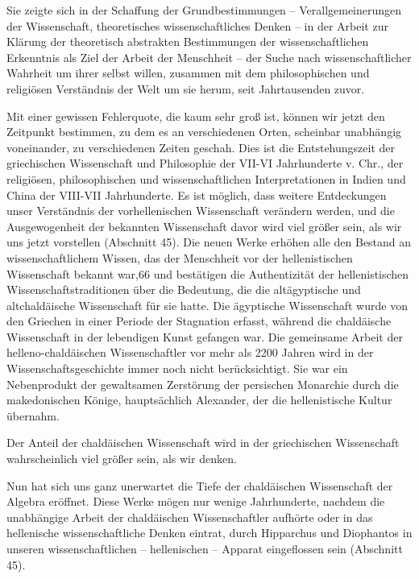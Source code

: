 \documentclass[11pt,a4paper]{book}
\begin{document}
Sie zeigte sich in der Schaffung der Grundbestimmungen -- Verallgemeinerungen der Wissenschaft, theoretisches wissenschaftliches Denken -- in der Arbeit zur Klärung der theoretisch abstrakten Bestimmungen der wissenschaftlichen Erkenntnis als Ziel der Arbeit der Menschheit -- der Suche nach wissenschaftlicher Wahrheit um ihrer selbst willen, zusammen mit dem philosophischen und religiösen Verständnis der Welt um sie herum, seit Jahrtausenden zuvor. 

Mit einer gewissen Fehlerquote, die kaum sehr groß ist, können wir jetzt den Zeitpunkt bestimmen, zu dem es an verschiedenen Orten, scheinbar unabhängig voneinander, zu verschiedenen Zeiten geschah. Dies ist die Entstehungszeit der griechischen Wissenschaft und Philosophie der VII-VI Jahrhunderte v. Chr., der religiösen, philosophischen und wissenschaftlichen Interpretationen in Indien und China der VIII-VII Jahrhunderte. Es ist möglich, dass weitere Entdeckungen unser Verständnis der vorhellenischen Wissenschaft verändern werden, und die Ausgewogenheit der bekannten Wissenschaft davor wird viel größer sein, als wir uns jetzt vorstellen (Abschnitt 45). Die neuen Werke erhöhen alle den Bestand an wissenschaftlichem Wissen, das der Menschheit vor der hellenistischen Wissenschaft bekannt war,66 und bestätigen die Authentizität der hellenistischen Wissenschaftstraditionen über die Bedeutung, die die altägyptische und altchaldäische Wissenschaft für sie hatte. Die ägyptische Wissenschaft wurde von den Griechen in einer Periode der Stagnation erfasst, während die chaldäische Wissenschaft in der lebendigen Kunst gefangen war. Die gemeinsame Arbeit der helleno-chaldäischen Wissenschaftler vor mehr als 2200 Jahren wird in der Wissenschaftsgeschichte immer noch nicht berücksichtigt. Sie war ein Nebenprodukt der gewaltsamen Zerstörung der persischen Monarchie durch die makedonischen Könige, hauptsächlich Alexander, der die hellenistische Kultur übernahm. 

Der Anteil der chaldäischen Wissenschaft wird in der griechischen Wissenschaft wahrscheinlich viel größer sein, als wir denken. 

Nun hat sich uns ganz unerwartet die Tiefe der chaldäischen Wissenschaft der Algebra eröffnet. Diese Werke mögen nur wenige Jahrhunderte, nachdem die unabhängige Arbeit der chaldäischen Wissenschaftler aufhörte oder in das hellenische wissenschaftliche Denken eintrat, durch Hipparchus und Diophantos in unseren wissenschaftlichen -- hellenischen -- Apparat eingeflossen sein (Abschnitt 45). 
\end{document}
